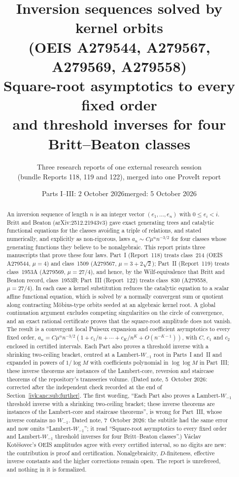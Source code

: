 \documentclass[11pt,letterpaper]{article}
\title{\textbf{Inversion sequences solved by kernel orbits}\\[4pt]
\textbf{(OEIS A279544, A279567, A279569, A279558)}\\[7pt]
\large Square-root asymptotics to every fixed order\\ and threshold inverses for four Britt--Beaton classes}
\author{Three research reports of one external research session\\(bundle Reports 118, 119 and 122), merged into one ProveIt report}
\date{Parts I--III: 2 October 2026\quad merged: 5 October 2026}
\theoremstyle{remark}\newtheorem{remark}[theorem]{Remark}
\begin{document}
\hypersetup{pageanchor=false}
\maketitle
\begin{abstract}
An inversion sequence of length $n$ is an integer vector $(e_1,\ldots,e_n)$ with $0\le e_i<i$. Britt and Beaton (arXiv:2512.21943v3) gave exact generating trees and catalytic functional equations for the classes avoiding a triple of relations, and stated numerically, and explicitly as non-rigorous, laws $a_n\sim C\mu^nn^{-3/2}$ for four classes whose generating functions they believe to be nonalgebraic. This report prints three manuscripts that prove these four laws. Part~I (Report~118) treats class~214 (OEIS A279544, $\mu=4$) and class~1509 (A279567, $\mu=3+2\sqrt2$); Part~II (Report~119) treats class~1953A (A279569, $\mu=27/4$), and hence, by the Wilf-equivalence that Britt and Beaton record, class~1953B; Part~III (Report~122) treats class~830 (A279558, $\mu=27/4$). In each case a kernel substitution reduces the catalytic equation to a scalar affine functional equation, which is solved by a normally convergent sum or quotient along contracting M\"obius-type orbits seeded at an algebraic kernel root. A global continuation argument excludes competing singularities on the circle of convergence, and an exact rational certificate proves that the square-root amplitude does not vanish. The result is a convergent local Puiseux expansion and coefficient asymptotics to every fixed order, $a_n=C\mu^nn^{-3/2}(1+c_1/n+\cdots+c_K/n^K+O(n^{-K-1}))$, with $C$, $c_1$ and $c_2$ enclosed in certified intervals. Each Part also proves a threshold inverse with a shrinking two-ceiling bracket, centred at a Lambert-$W_{-1}$ root in Parts~I and~II and expanded in powers of $1/\log M$ with coefficients polynomial in $\log\log M$ in Part~III; these inverse theorems are instances of the Lambert-core, reversion and staircase theorems of the repository's transseries volume. (Dated note, 5~October 2026: corrected after the independent check recorded at the end of Section~\ref{ivk:anc:sub:further}. The first wording, ``Each Part also proves a Lambert-$W_{-1}$ threshold inverse with a shrinking two-ceiling bracket; these inverse theorems are instances of the Lambert-core and staircase theorems'', is wrong for Part~III, whose inverse contains no $W_{-1}$. Dated note, 7~October 2026: the subtitle had the same error and now omits ``Lambert-$W_{-1}$''; it read ``Square-root asymptotics to every fixed order and Lambert-$W_{-1}$ threshold inverses for four Britt--Beaton classes''.) V\'aclav Kot\v{e}\v{s}ovec's OEIS amplitudes agree with every certified interval, so no digits are new: the contribution is proof and certification. Nonalgebraicity, $D$-finiteness, effective inverse constants and the higher corrections remain open. The report is unrefereed, and nothing in it is formalized.
\end{abstract}
\hypersetup{pageanchor=true}
\setcounter{tocdepth}{1}
{\small\setlength{\parskip}{0pt}\tableofcontents}
\newpage
\end{document}
